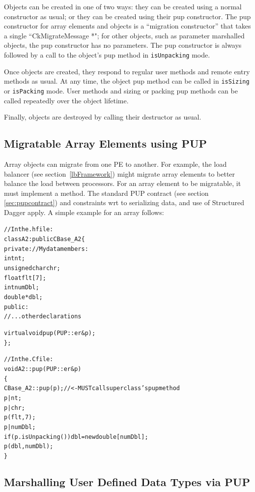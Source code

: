 Objects can be created in one of two ways: they can
be created using a normal constructor as usual; or they
can be created using their pup constructor.  The pup constructor
for \charmpp{} array elements and  objects
is a ``migration constructor'' that takes a single ``CkMigrateMessage *";
for other objects, such as parameter marshalled objects,
the pup constructor has no parameters.  The pup constructor
is always followed by a call to the object's pup method in
\verb.isUnpacking. mode.

Once objects are created, they respond to regular user methods
and remote entry methods as usual.  At any time, the object 
pup method can be called in \verb.isSizing. or \verb.isPacking.
mode.  User methods and sizing or packing pup methods can be called
repeatedly over the object lifetime.

Finally, objects are destroyed by calling their destructor
as usual.


\subsection{Migratable Array Elements using PUP}

\label{arraymigratable}
Array objects can migrate from one PE to another.  For
example, the load balancer (see section~\ref{lbFramework}) might
migrate array elements to better balance the load between processors.
For an array element to be migratable, it must implement a 
method.  The standard PUP contract (see section \ref{sec:pupcontract})
and constraints wrt to serializing data, and use of Structured Dagger apply.  A simple example for an array follows:

\begin{alltt}
//In the .h file:
class A2 : public CBase\_A2 \{
private: //My data members:
    int nt;
    unsigned char chr;
    float flt[7];
    int numDbl;
    double *dbl;
public:	
    //...other declarations

    virtual void pup(PUP::er \&p);
\};

//In the .C file:
void A2::pup(PUP::er \&p)
\{
    CBase\_A2::pup(p); //<- MUST call superclass's pup method
    p|nt;
    p|chr;
    p(flt,7);
    p|numDbl;
    if (p.isUnpacking()) dbl=new double[numDbl];
    p(dbl,numDbl);
\}
\end{alltt}

\subsection{Marshalling User Defined Data Types via PUP}


